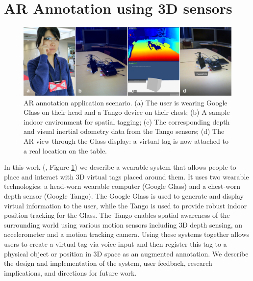 
\section{AR Annotation using 3D sensors}
\label{sec:3D}

\begin{figure}[ht]
  \centering
  \includegraphics[width=\linewidth]{images/mgia15/sampleteaser-01.jpg}
  \caption{AR annotation application scenario. (a) The user is wearing Google Glass on their head and a Tango device on their chest; (b) A sample indoor environment for spatial tagging; (c) The corresponding depth and visual inertial odometry data from the Tango sensors; (d) The AR view through the Glass display: a virtual tag is now attached to a real location on the table.}
  \label{fig:mgia15:teaser}
\end{figure}

In this work (\cite{Nassani2015a, Nassani2015}, Figure \ref{fig:mgia15:teaser}) we describe a wearable system that allows people to place and interact with 3D virtual tags placed around them. It uses two wearable technologies: a head-worn wearable computer (Google Glass) and a chest-worn depth sensor (Google Tango). The Google Glass is used to generate and display virtual information to the user, while the Tango is used to provide robust indoor position tracking for the Glass. The Tango enables spatial awareness of the surrounding world using various motion sensors including 3D depth sensing, an accelerometer and a motion tracking camera. Using these systems together allows users to create a virtual tag via voice input and then register this tag to a physical object or position in 3D space as an augmented annotation. We describe the design and implementation of the system, user feedback, research implications, and directions for future work.  

